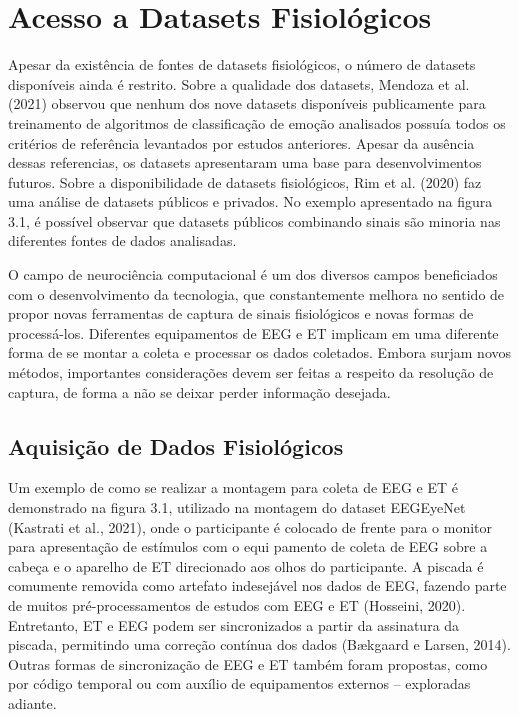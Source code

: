 \chapter{Acesso a Datasets Fisiológicos}

Apesar da existência de fontes de datasets fisiológicos, 
o número de datasets disponíveis ainda é restrito. Sobre a qualidade dos datasets, 
Mendoza et al. (2021) observou que nenhum dos nove datasets disponíveis publicamente para 
treinamento de algoritmos de classificação de emoção analisados possuía todos os critérios de 
referência levantados por estudos anteriores. Apesar da ausência dessas referencias, os datasets 
apresentaram uma base para desenvolvimentos futuros. Sobre a disponibilidade de datasets fisiológicos,
Rim et al. (2020) faz uma análise de datasets públicos e privados.
 No exemplo apresentado na figura 3.1, 
 é possível observar que datasets públicos combinando sinais são minoria nas diferentes fontes de dados analisadas. 

 O campo de neurociência computacional é um dos diversos campos beneficiados 
 com o desenvolvimento da tecnologia, que constantemente melhora no sentido 
 de propor novas ferramentas de captura de sinais fisiológicos e novas formas de
  processá-los. Diferentes equipamentos de EEG e ET implicam em uma diferente forma
   de se montar a coleta e processar os dados coletados.
  Embora surjam novos métodos, importantes considerações devem ser feitas a 
  respeito da resolução de captura, de forma a não se deixar perder informação desejada.   

\section{Aquisição de Dados Fisiológicos}

Um exemplo de como se realizar a montagem para coleta de EEG e ET é demonstrado na figura 3.1, utilizado na montagem do dataset EEGEyeNet (Kastrati et al., 2021),
onde o participante é colocado de frente para o monitor para apresentação de estímulos com o equi
pamento de coleta de EEG sobre a cabeça e o aparelho de ET direcionado aos olhos do participante. A piscada é comumente
removida como artefato indesejável nos dados de EEG, fazendo parte de muitos pré-processamentos de estudos com EEG e ET (Hosseini, 2020).
Entretanto, ET e EEG podem ser sincronizados a partir da assinatura da piscada, permitindo uma correção contínua dos dados (Bækgaard e Larsen, 2014). 
Outras formas de sincronização de EEG e ET também foram propostas, como por código temporal ou com auxílio de equipamentos externos – exploradas adiante. 
 
